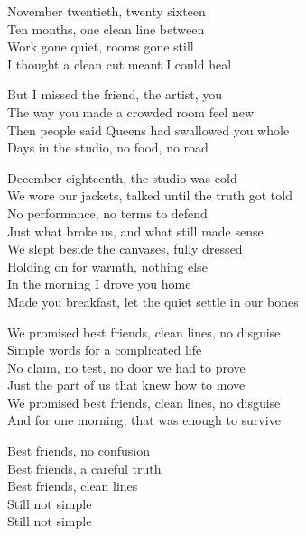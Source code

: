 \begin{lyrics}
November twentieth, twenty sixteen\\
Ten months, one clean line between\\
Work gone quiet, rooms gone still\\
I thought a clean cut meant I could heal

But I missed the friend, the artist, you\\
The way you made a crowded room feel new\\
Then people said Queens had swallowed you whole\\
Days in the studio, no food, no road

December eighteenth, the studio was cold\\
We wore our jackets, talked until the truth got told\\
No performance, no terms to defend\\
Just what broke us, and what still made sense\\
We slept beside the canvases, fully dressed\\
Holding on for warmth, nothing else\\
In the morning I drove you home\\
Made you breakfast, let the quiet settle in our bones

We promised best friends, clean lines, no disguise\\
Simple words for a complicated life\\
No claim, no test, no door we had to prove\\
Just the part of us that knew how to move\\
We promised best friends, clean lines, no disguise\\
And for one morning, that was enough to survive

Best friends, no confusion\\
Best friends, a careful truth\\
Best friends, clean lines\\
Still not simple\\
Still not simple
\end{lyrics}

